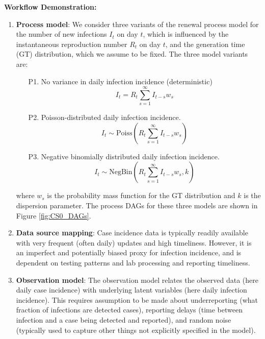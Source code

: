 \documentclass{article}
\begin{document}
\textbf{Workflow Demonstration:}
\begin{enumerate}
    \item \textbf{Process model}: We consider three variants of the renewal process model for the number of new infections $I_t$ on day $t$, which is influenced by the instantaneous reproduction number $R_t$ on day $t$, and the generation time (GT) distribution, which we assume to be fixed. The three model variants are:
\begin{itemize}
    \item[P1.] No variance in daily infection incidence (deterministic)
    \begin{equation} \label{eq:infections_P1}
        I_t = R_t \sum_{s=1}^\infty I_{t-s}w_s 
    \end{equation}
    \item[P2.] Poisson-distributed daily infection incidence.
        \begin{equation} \label{eq:infections_P2}
        I_t \sim \mathrm{Poiss}\left( R_t \sum_{s=1}^\infty I_{t-s}w_s  \right)
    \end{equation}
    \item[P3.] Negative binomially distributed daily infection incidence. 
            \begin{equation} \label{eq:infections_P3}
        I_t \sim \mathrm{NegBin}\left( R_t \sum_{s=1}^\infty I_{t-s}w_s, k  \right)
    \end{equation}
\end{itemize}
where $w_s$ is the probability mass function for the GT distribution and $k$ is the dispersion parameter. 
The process DAGs for these three models are shown in Figure \ref{fig:CS0_DAGs}.

 
\item \textbf{Data source mapping}: Case incidence data is typically readily available with very frequent (often daily) updates and high timeliness. However, it is an imperfect and potentially biased proxy for infection incidence, and is dependent on testing patterns and lab processing and reporting timeliness. 


\item \textbf{Observation model}: The observation model relates the observed data (here daily case incidence) with underlying latent variables (here daily infection incidence). 
This requires assumption to be made about underreporting (what fraction of infections are detected cases), reporting delays (time between infection and a case being detected and reported), and random noise (typically used to capture other things not explicitly specified in the model).


\end{enumerate}
\end{document}
